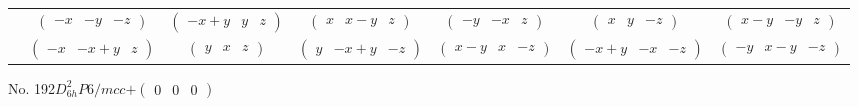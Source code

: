 \documentclass[fleqn,9pt,landscape]{jsarticle}
\begin{document}
\begin{center}
\begin{longtable}{ccccccc}
& $ \begin{pmatrix} - x & - y & - z \end{pmatrix} $ & $ \begin{pmatrix} - x + y & y & z \end{pmatrix} $ & $ \begin{pmatrix} x & x - y & z \end{pmatrix} $ & $ \begin{pmatrix} - y & - x & z \end{pmatrix} $ & $ \begin{pmatrix} x & y & - z \end{pmatrix} $ & $ \begin{pmatrix} x - y & - y & z \end{pmatrix} $ \\
& $ \begin{pmatrix} - x & - x + y & z \end{pmatrix} $ & $ \begin{pmatrix} y & x & z \end{pmatrix} $ & $ \begin{pmatrix} y & - x + y & - z \end{pmatrix} $ & $ \begin{pmatrix} x - y & x & - z \end{pmatrix} $ & $ \begin{pmatrix} - x + y & - x & - z \end{pmatrix} $ & $ \begin{pmatrix} - y & x - y & - z \end{pmatrix} $ \\
\end{longtable}
\end{center}
\newpage
No. 192\quad$D_{6h}^{2}$\quad$P6/mcc$\quad[ hexagonal ]\quad$+\begin{pmatrix} 0 & 0 & 0 \end{pmatrix}$
\end{document}
